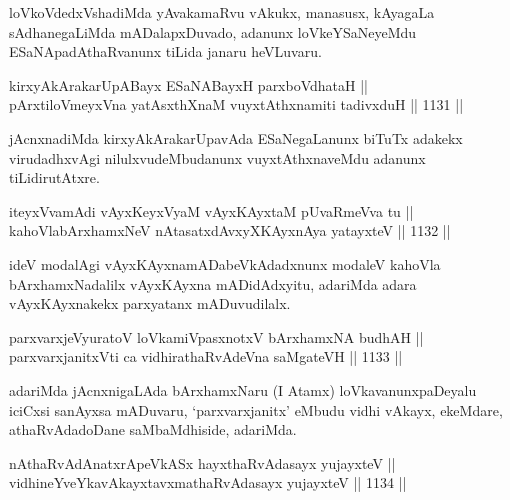 \begin{artha}
loVkoVdedxVshadiMda yAvakamaRvu vAkukx, manasusx, kAyagaLa sAdhanegaLiMda mADalapxDuvado, adanunx loVkeYSaNeyeMdu ESaNApadAthaRvanunx tiLida janaru heVLuvaru.
\end{artha}


\begin{shl}
kirxyAkArakarUpABayx ESaNABayxH parxboVdhataH || \\
pArxtiloVmeyxVna yatAsxthXnaM vuyxtAthxnamiti tadivxduH \hfill || 1131 ||  
\end{shl}

\begin{artha}
jAcnxnadiMda kirxyAkArakarUpavAda ESaNegaLanunx biTuTx adakekx virudadhxvAgi nilulxvudeMbudanunx vuyxtAthxnaveMdu adanunx tiLidirutAtxre.
\end{artha}

\begin{shl}
iteyxVvamAdi vAyxKeyxVyaM vAyxKAyxtaM pUvaRmeVva tu || \\
kahoVlabArxhamxNeV nAtasatxdAvxyXKAyxnAya yatayxteV \hfill || 1132 ||  
\end{shl}

\begin{artha}
ideV modalAgi vAyxKAyxnamADabeVkAdadxnunx modaleV kahoVla bArxhamxNadalilx vAyxKAyxna mADidAdxyitu, adariMda adara vAyxKAyxnakekx parxyatanx mADuvudilalx.
\end{artha}


\begin{shl}
parxvarxjeVyuratoV loVkamiVpasxnotxV bArxhamxNA budhAH || \\
parxvarxjanitxVti ca vidhirathaRvAdeVna saMgateVH \hfill || 1133 ||  
\end{shl}

\begin{artha}
adariMda jAcnxnigaLAda bArxhamxNaru (I Atamx) loVkavanunx\break paDeyalu iciCxsi sanAyxsa mADuvaru, `parxvarxjanitx' eMbudu vidhi vAkayx, ekeMdare, athaRvAdadoDane saMbaMdhiside, adariMda.
\end{artha}


\begin{shl}
nAthaRvAdAnatxrApeVkASx hayxthaRvAdasayx yujayxteV || \\
vidhineYveYkavAkayxtavxmathaRvAdasayx yujayxteV \hfill || 1134 ||  
\end{shl}

